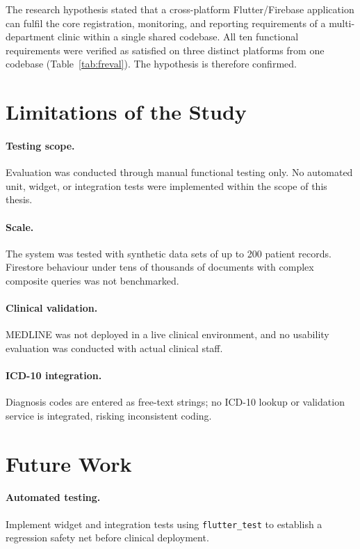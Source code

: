 \documentclass[12pt,a4paper,oneside]{report}
\begin{document}
The research hypothesis stated that a cross-platform Flutter/Firebase application
can fulfil the core registration, monitoring, and reporting requirements of a
multi-department clinic within a single shared codebase. All ten functional
requirements were verified as satisfied on three distinct platforms from one
codebase (Table~\ref{tab:freval}). The hypothesis is therefore confirmed.

\section{Limitations of the Study}

\paragraph{Testing scope.} Evaluation was conducted through manual functional
testing only. No automated unit, widget, or integration tests were implemented
within the scope of this thesis.

\paragraph{Scale.} The system was tested with synthetic data sets of up to 200
patient records. Firestore behaviour under tens of thousands of documents with
complex composite queries was not benchmarked.

\paragraph{Clinical validation.} MEDLINE was not deployed in a live clinical
environment, and no usability evaluation was conducted with actual clinical
staff.

\paragraph{ICD-10 integration.} Diagnosis codes are entered as free-text
strings; no ICD-10 lookup or validation service is integrated, risking
inconsistent coding.

\section{Future Work}
\label{sec:futurework}

\paragraph{Automated testing.} Implement widget and integration tests using
\texttt{flutter\_test} to establish a regression safety net before clinical
deployment.
\end{document}
